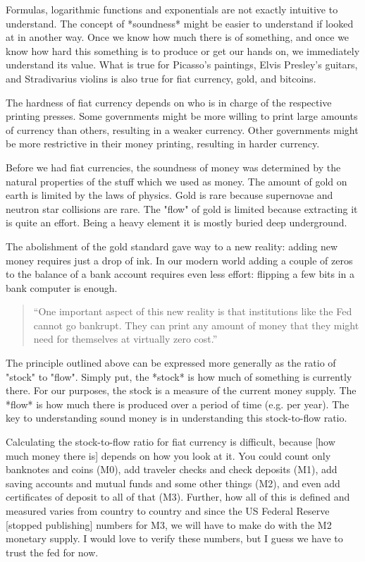 
Formulas, logarithmic functions and exponentials are not exactly
intuitive to understand. The concept of *soundness* might be easier to
understand if looked at in another way. Once we know how much there is
of something, and once we know how hard this something is to produce or
get our hands on, we immediately understand its value. What is true for
Picasso's paintings, Elvis Presley's guitars, and Stradivarius violins
is also true for fiat currency, gold, and bitcoins.

The hardness of fiat currency depends on who is in charge of the
respective printing presses. Some governments might be more willing to
print large amounts of currency than others, resulting in a weaker
currency. Other governments might be more restrictive in their money
printing, resulting in harder currency.

Before we had fiat currencies, the soundness of money was determined by
the natural properties of the stuff which we used as money. The amount
of gold on earth is limited by the laws of physics. Gold is rare because
supernovae and neutron star collisions are rare. The "flow" of gold is
limited because extracting it is quite an effort. Being a heavy element
it is mostly buried deep underground.

The abolishment of the gold standard gave way to a new reality: adding
new money requires just a drop of ink. In our modern world adding a
couple of zeros to the balance of a bank account requires even less
effort: flipping a few bits in a bank computer is enough.

\begin{quotation}
``One important aspect of this new reality is that institutions like
the Fed cannot go bankrupt. They can print any amount of money that
they might need for themselves at virtually zero cost.''
\end{quotation}

The principle outlined above can be expressed more generally as the
ratio of "stock" to "flow". Simply put, the *stock* is how much of
something is currently there. For our purposes, the stock is a measure
of the current money supply. The *flow* is how much there is produced
over a period of time (e.g. per year). The key to understanding sound
money is in understanding this stock-to-flow ratio.

Calculating the stock-to-flow ratio for fiat currency is difficult,
because [how much money there is] depends on how you look at it. You
could count only banknotes and coins (M0), add traveler checks and check
deposits (M1), add saving accounts and mutual funds and some other
things (M2), and even add certificates of deposit to all of that (M3).
Further, how all of this is defined and measured varies from country to
country and since the US Federal Reserve [stopped publishing] numbers
for M3, we will have to make do with the M2 monetary supply. I would
love to verify these numbers, but I guess we have to trust the fed for
now.

